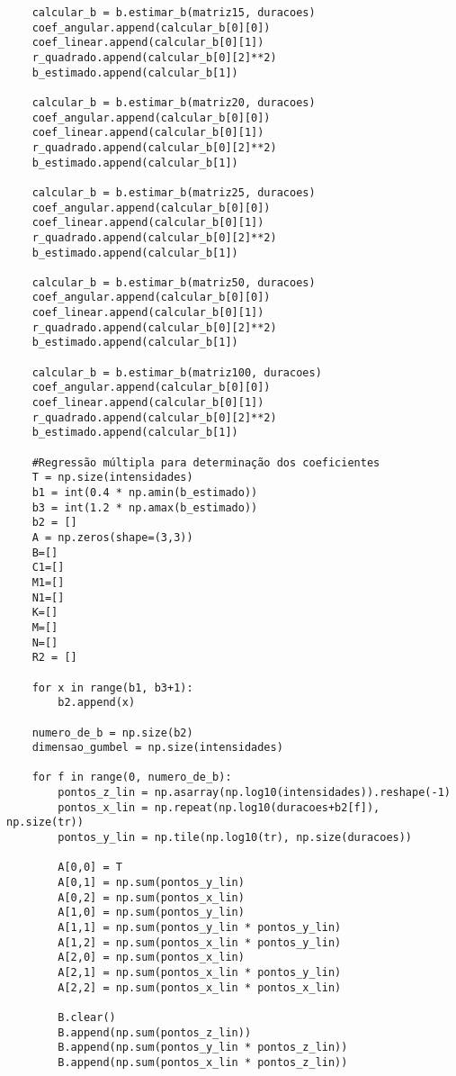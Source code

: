 \begin{apendicesenv}
\begin{verbatim}
    calcular_b = b.estimar_b(matriz15, duracoes)
    coef_angular.append(calcular_b[0][0])
    coef_linear.append(calcular_b[0][1])
    r_quadrado.append(calcular_b[0][2]**2)
    b_estimado.append(calcular_b[1])
    
    calcular_b = b.estimar_b(matriz20, duracoes)
    coef_angular.append(calcular_b[0][0])
    coef_linear.append(calcular_b[0][1])
    r_quadrado.append(calcular_b[0][2]**2)
    b_estimado.append(calcular_b[1])
    
    calcular_b = b.estimar_b(matriz25, duracoes)
    coef_angular.append(calcular_b[0][0])
    coef_linear.append(calcular_b[0][1])
    r_quadrado.append(calcular_b[0][2]**2)
    b_estimado.append(calcular_b[1])
    
    calcular_b = b.estimar_b(matriz50, duracoes)
    coef_angular.append(calcular_b[0][0])
    coef_linear.append(calcular_b[0][1])
    r_quadrado.append(calcular_b[0][2]**2)
    b_estimado.append(calcular_b[1])
    
    calcular_b = b.estimar_b(matriz100, duracoes)
    coef_angular.append(calcular_b[0][0])
    coef_linear.append(calcular_b[0][1])
    r_quadrado.append(calcular_b[0][2]**2)
    b_estimado.append(calcular_b[1])
    
    #Regressão múltipla para determinação dos coeficientes
    T = np.size(intensidades)
    b1 = int(0.4 * np.amin(b_estimado))
    b3 = int(1.2 * np.amax(b_estimado))
    b2 = []
    A = np.zeros(shape=(3,3))
    B=[]
    C1=[]
    M1=[]
    N1=[]
    K=[]
    M=[]
    N=[]
    R2 = []
    
    for x in range(b1, b3+1):
        b2.append(x)
    
    numero_de_b = np.size(b2)
    dimensao_gumbel = np.size(intensidades)
    
    for f in range(0, numero_de_b):
        pontos_z_lin = np.asarray(np.log10(intensidades)).reshape(-1) 
        pontos_x_lin = np.repeat(np.log10(duracoes+b2[f]), np.size(tr))
        pontos_y_lin = np.tile(np.log10(tr), np.size(duracoes)) 
    
        A[0,0] = T
        A[0,1] = np.sum(pontos_y_lin)
        A[0,2] = np.sum(pontos_x_lin)
        A[1,0] = np.sum(pontos_y_lin)
        A[1,1] = np.sum(pontos_y_lin * pontos_y_lin)
        A[1,2] = np.sum(pontos_x_lin * pontos_y_lin)
        A[2,0] = np.sum(pontos_x_lin)
        A[2,1] = np.sum(pontos_x_lin * pontos_y_lin)
        A[2,2] = np.sum(pontos_x_lin * pontos_x_lin)
    
        B.clear()
        B.append(np.sum(pontos_z_lin))
        B.append(np.sum(pontos_y_lin * pontos_z_lin))
        B.append(np.sum(pontos_x_lin * pontos_z_lin))
    

\end{verbatim}
\end{apendicesenv}
